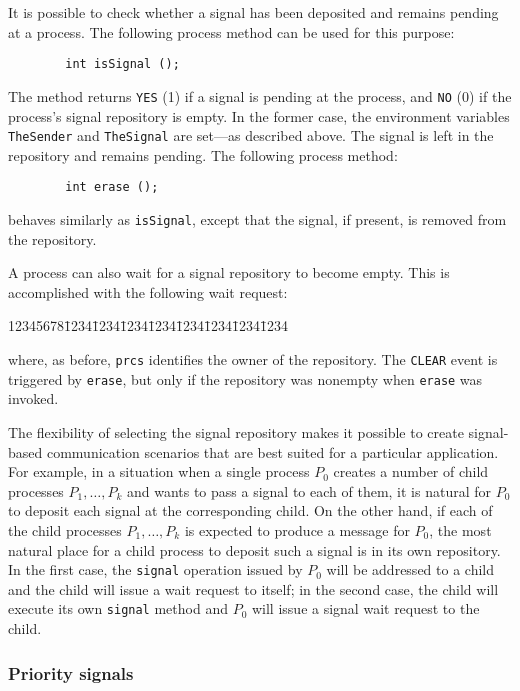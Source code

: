 It is possible to check whether a signal has been deposited and remains
pending at a process.
The following process method can be used for this purpose:
\begin{verbatim}
        int isSignal ();
\end{verbatim}
The method returns {\tt YES} (1) if a signal is pending at the process,
and {\tt NO} (0) if the process's signal repository is empty.
In the former case, the environment variables {\tt TheSender} and
{\tt TheSignal} are set---as described above.
The signal is left in the repository and remains pending.
The following process method:
\begin{verbatim}
        int erase ();
\end{verbatim}
behaves similarly as {\tt isSignal}, except that the signal, if present, is
removed from the repository.

A process can also wait for a signal repository to become empty.
This is accomplished with the following wait request:
{\tt\begin{tabbing}
12345678\=1234\=1234\=1234\=1234\=1234\=1234\=1234\=1234\kill
{}
\end{tabbing}}
\noindent
where, as before, {\tt prcs} identifies the owner of the repository.
The {\tt CLEAR} event is triggered by {\tt erase}, but only if
the repository was nonempty when {\tt erase} was invoked.

\medskip

The flexibility of selecting the signal repository makes it possible to
create signal-based communication scenarios that are best suited for
a particular application.
For example, in a situation when a single
process $P_0$ creates a number of
child processes $P_1, \ldots, P_k$ and
wants to pass a signal to each of them, it is natural for $P_0$ to deposit each signal at the corresponding child.
On the other hand, if each of
the child processes $P_1, \ldots, P_k$ is expected to 
produce a message for $P_0$, the most natural place for a
child process to deposit such a signal is in its own repository.
In the first case, the {\tt signal} operation
issued by $P_0$ will be
addressed to a child and the child will issue a wait request to itself;
in the second case, the child will execute its own {\tt signal} method
and $P_0$ will issue a signal wait request to the child.

\subsubsection{Priority signals}
\label{rm_pr_sp_ps}

